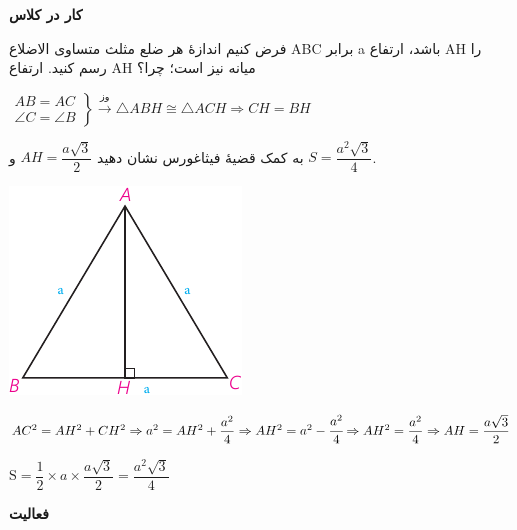 \documentclass[12pt, a4paper]{book}
\begin{document}
\bigskip

\textbf{کار در کلاس}

\begin{minipage}{0.7\textwidth}
	فرض کنیم اندازهٔ هر ضلع مثلث متساوی الاضلاع ABC برابر a باشد، ارتفاع AH را رسم کنید. ارتفاع AH میانه نیز است؛ چرا؟
	\begin{flushleft}
		$
	\left.
	\begin{array}{ccc}
		AB = AC \\
		\angle C = \angle B
	\end{array}
	\right\}
	\xrightarrow{\mbox{وز}} \triangle ABH \cong \triangle ACH \Rightarrow CH = BH
	$
	\end{flushleft}
	به کمک قضیهٔ فیثاغورس نشان دهید 
	$AH = \dfrac{a\sqrt{3}}2$
	و 
	$S = \dfrac{a^2 \sqrt{3}}{4}$.
\end{minipage}
\begin{minipage}{0.25\textwidth}
	\begin{flushleft}
		\includegraphics{"Shapes/Fasl - 3/Dars 2/P65-S3"}
	\end{flushleft}
\end{minipage}

	\begin{flushleft}
	$
	AC^2 = AH^2 + CH^2 \Rightarrow a^2 = AH^2 + \dfrac{a^2}{4} \Rightarrow AH^2 = a^2 - \cfrac{a^2}{4} \Rightarrow AH^2 = \dfrac{a^2}{4} \Rightarrow AH = \dfrac{a\sqrt{3}}{2}
	$
	
	$
	\mathrm{S} = \dfrac12 \times a \times \dfrac{a\sqrt{3}}{2} = \dfrac{a^2\sqrt{3}}{4}
	$
\end{flushleft}


\bigskip

\textbf{فعالیت}
\end{document}
